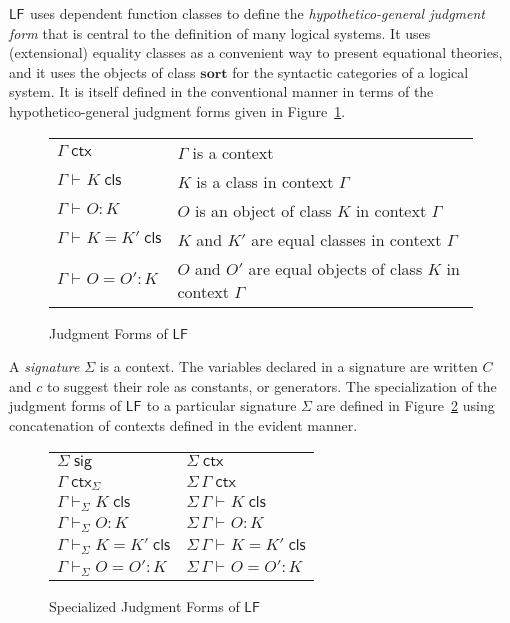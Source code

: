 \documentclass[11pt,twoside]{article}
\newcommand{\LF}[1][]{\ensuremath{\mathsf{LF}_{#1}}}
\newcommand{\sortclass}{\ensuremath{\textbf{sort}}}
\newcommand{\appctx}[2]{{#1}\,{#2}}
\newcommand{\issig}[1]{{#1}\;\mathsf{sig}}
\newcommand{\isctx}[2][]{{#2}\;\mathsf{ctx}_{#1}}
\newcommand{\iscls}[3][]{{#2}\vdash_{#1}{#3}\;\mathsf{cls}}
\newcommand{\eqcls}[4][]{{#2}\vdash_{#1}{#3}={#4}\;\mathsf{cls}}
\newcommand{\isobj}[4][]{{#2}\vdash_{#1}{#3}:{#4}}
\newcommand{\eqobj}[5][]{{#2}\vdash_{#1}{#3}={#4}:{#5}}
\begin{document}
\LF{} uses dependent function classes to define the \emph{hypothetico-general judgment
  form} that is central to the definition of many logical systems.  It uses (extensional)
equality classes as a convenient way to present equational theories, and it uses the
objects of class \sortclass{} for the syntactic categories of a logical system.  It is
itself defined in the conventional manner in terms of the hypothetico-general judgment
forms given in Figure~\ref{fig:lf-judgments}.

\begin{figure}[tp]
  \centering
  \begin{tabular}{l@{\qquad}l}
    $\isctx{\Gamma}$ & $\Gamma$ is a context \\[1ex]
    $\iscls{\Gamma}{K}$ & $K$ is a class in context $\Gamma$ \\
    $\isobj{\Gamma}{O}{K}$ & $O$ is an object of class $K$ in context $\Gamma$ \\[1ex]
    $\eqcls{\Gamma}{K}{K'}$ & $K$ and $K'$ are equal classes in context $\Gamma$ \\
    $\eqobj{\Gamma}{O}{O'}{K}$ & $O$ and $O'$ are equal objects of class $K$ in context $\Gamma$
  \end{tabular}
  \caption{Judgment Forms of \LF{}}
  \label{fig:lf-judgments}
\end{figure}

A \emph{signature} $\Sigma$ is a context.  The variables declared in a signature are written
$C$ and $c$ to suggest their role as constants, or generators.  The specialization of the
judgment forms of \LF{} to a particular signature $\Sigma$ are defined in
Figure~\ref{fig:lf-specialized} using concatenation of contexts defined in the evident
manner.

\begin{figure}[tp]
  \centering
  \begin{tabular}{l@{\qquad\qquad}l}
    $\issig{\Sigma}$             & $\isctx{\Sigma}$ \\[1ex]

    $\isctx[\Sigma]{\Gamma}$           & $\isctx{\appctx{\Sigma}{\Gamma}}$  \\[1ex]
    
    $\iscls[\Sigma]{\Gamma}{K}$           & $\iscls{\appctx{\Sigma}{\Gamma}}{K}$ \\
    $\isobj[\Sigma]{\Gamma}{O}{K}$     & $\isobj{\appctx{\Sigma}{\Gamma}}{O}{K}$ \\[1ex]

    $\eqcls[\Sigma]{\Gamma}{K}{K'}$   & $\eqcls{\appctx{\Sigma}{\Gamma}}{K}{K'}$ \\
    $\eqobj[\Sigma]{\Gamma}{O}{O'}{K}$ & $\eqobj{\appctx{\Sigma}{\Gamma}}{O}{O'}{K}$
  \end{tabular}
  \caption{Specialized Judgment Forms of \LF{}}
  \label{fig:lf-specialized}
\end{figure}
\end{document}
